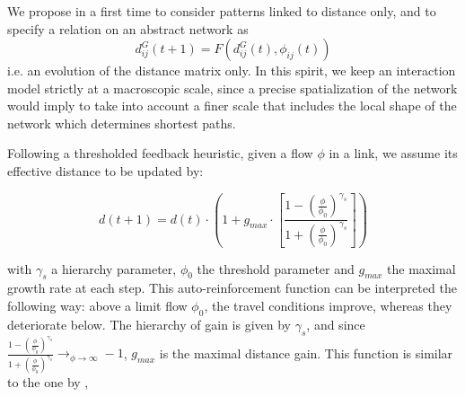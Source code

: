 \subsubsection{}

We propose in a first time to consider patterns linked to distance only, and to specify a relation on an abstract network as
\begin{equation}
d^G_{ij}(t+1) = F(d^G_{ij}(t),\phi_{ij}(t))
\end{equation}
i.e. an evolution of the distance matrix only. In this spirit, we keep an interaction model strictly at a macroscopic scale, since a precise spatialization of the network would imply to take into account a finer scale that includes the local shape of the network which determines shortest paths.


Following a thresholded feedback heuristic, given a flow $\phi$ in a link, we assume its effective distance to be updated by:

\begin{equation}
d(t+1) = d(t)\cdot \left( 1 + g_{max} \cdot \left[\frac{1 - \left(\frac{\phi}{\phi_0}\right)^{\gamma_s}}{1 + \left(\frac{\phi}{\phi_0}\right)^{\gamma_s}}\right]\right)
\end{equation}

with $\gamma_s$ a hierarchy parameter, $\phi_0$ the threshold parameter and $g_{max}$ the maximal growth rate at each step. This auto-reinforcement function can be interpreted the following way: above a limit flow $\phi_0$, the travel conditions improve, whereas they deteriorate below. The hierarchy of gain is given by $\gamma_s$, and since $\frac{1 - \left(\frac{\phi}{\phi_0}\right)^{\gamma_s}}{1 + \left(\frac{\phi}{\phi_0}\right)^{\gamma_s}} \rightarrow_{\phi\rightarrow \infty} -1$, $g_{max}$ is the maximal distance gain. This function is similar to the one  by \cite{tero2007mathematical}, 



